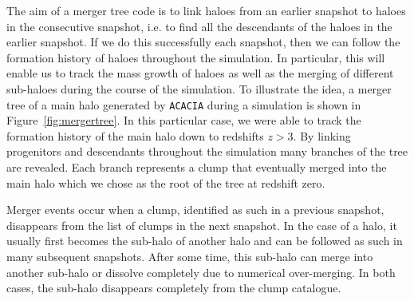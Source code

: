 The aim of a merger tree code is to link haloes from an earlier
snapshot to haloes in the consecutive snapshot, i.e. to find all the
descendants of the haloes in the earlier snapshot. If we do this 
successfully each snapshot, then we can follow the formation history of 
haloes throughout the simulation. In particular, this will enable us
to track the mass growth of haloes as well as the merging of different
sub-haloes during the course of the simulation. 
To illustrate the idea, a merger tree of a main halo generated by 
\texttt{ACACIA} during a simulation is shown in Figure~\ref{fig:mergertree}.
In this particular case, we were able to track the formation history of the 
main halo down to redshifts $z > 3$. By linking progenitors and descendants 
throughout the simulation many branches of the tree are revealed. 
Each branch represents a clump that eventually merged into the main halo 
which we chose as the root of the tree at redshift zero.

Merger events occur when a clump, identified as such in a previous
snapshot, disappears from the list of clumps in the next snapshot. In
the case of a halo, it usually first becomes the sub-halo of another
halo and can be followed as such in many subsequent snapshots. After
some time, this sub-halo can merge into another sub-halo or dissolve
completely due to numerical over-merging. In both cases, the sub-halo
disappears completely from the clump catalogue.

